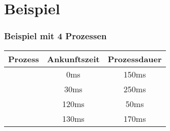 \section{Beispiel}

\begin{frame}
    \frametitle{Beispiel mit 4 Prozessen}


    \begin{table}[]
        \begin{adjustbox}{width=0.4\textwidth}
            \begin{tabular}{c|c|c}
                \textbf{Prozess} & \textbf{Ankunftszeit} & \textbf{Prozessdauer} \\
                \hline{}
                \PZero{}         & 0ms                   & 150ms                 \\
                \POne{}          & 30ms                  & 250ms                 \\
                \PTwo{}          & 120ms                 & 50ms                  \\
                \PThree{}        & 130ms                 & 170ms
            \end{tabular}
        \end{adjustbox}
    \end{table}


\end{frame}
